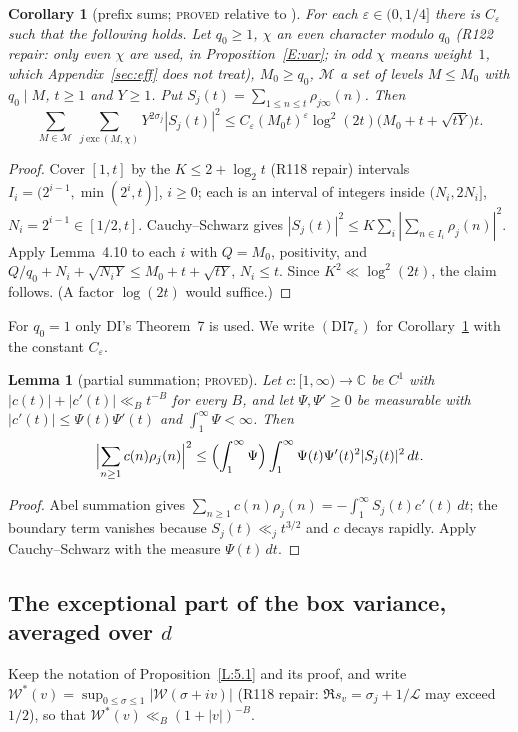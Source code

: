\documentclass[10pt,reqno]{amsart}
\newtheorem{lemma}[theorem]{Lemma}
\newtheorem{corollary}[theorem]{Corollary}
\theoremstyle{definition}
\numberwithin{equation}{section}
\newcommand{\C}{\mathbb C}
\newcommand{\cL}{\mathcal L}
\newcommand{\status}[1]{\textup{\textsc{#1}}}
\begin{document}
\begin{corollary}[prefix sums; \status{proved} relative to \cite{DI,Dr}]\label{E:DI7}
For each $\varepsilon\in(0,1/4]$ there is $C_\varepsilon$ such that the
following holds. Let $q_0\ge1$, $\chi$ an even character modulo $q_0$ (R122 repair: only even $\chi$ are used, in Proposition~\ref{E:var}; in \cite{Dr} odd $\chi$ means weight~$1$, which Appendix~\ref{sec:eff} does not treat), $M_0\ge q_0$,
$\mathcal M$ a set of levels $M\le M_0$ with $q_0\mid M$, $t\ge1$ and
$Y\ge1$. Put $S_j(t)=\sum_{1\le n\le t}\rho_{j\infty}(n)$. Then
\[
 \sum_{M\in\mathcal M}\ \sum_{j\ \mathrm{exc}\ (M,\chi)}
 Y^{2\sigma_j}|S_j(t)|^2
 \le C_\varepsilon(M_0t)^\varepsilon\log^2(2t)
   \bigl(M_0+t+\sqrt{tY}\bigr)t .
\]
\end{corollary}
\begin{proof}
Cover $[1,t]$ by the $K\le2+\log_2t$ (R118 repair) intervals
$I_i=(2^{i-1},\min(2^i,t)]$, $i\ge0$; each is an interval of integers
inside $(N_i,2N_i]$, $N_i=2^{i-1}\in[1/2,t]$. Cauchy--Schwarz gives
$|S_j(t)|^2\le K\sum_i|\sum_{n\in I_i}\rho_j(n)|^2$. Apply
Lemma~4.10 to each $i$ with $Q=M_0$, positivity, and
$Q/q_0+N_i+\sqrt{N_iY}\le M_0+t+\sqrt{tY}$, $N_i\le t$. Since
$K^2\ll\log^2(2t)$, the claim follows. (A factor $\log(2t)$ would suffice.)
\end{proof}
For $q_0=1$ only DI's Theorem~7 is used. We write $(\mathrm{DI7}_\varepsilon)$
for Corollary~\ref{E:DI7} with the constant $C_\varepsilon$.

\begin{lemma}[partial summation; \status{proved}]\label{E:abel}
Let $c:[1,\infty)\to\C$ be $C^1$ with $|c(t)|+|c'(t)|\ll_Bt^{-B}$ for every
$B$, and let $\Psi,\Psi'\ge0$ be measurable with
$|c'(t)|\le\Psi(t)\Psi'(t)$ and $\int_1^\infty\Psi<\infty$. Then
\[
 \Bigl|\sum_{n\ge1}c(n)\rho_j(n)\Bigr|^2\le
 \Bigl(\int_1^\infty\Psi\Bigr)
 \int_1^\infty\Psi(t)\Psi'(t)^2|S_j(t)|^2\,dt .
\]
\end{lemma}
\begin{proof}
Abel summation gives $\sum_{n\ge1}c(n)\rho_j(n)=-\int_1^\infty S_j(t)c'(t)\,dt$;
the boundary term vanishes because $S_j(t)\ll_jt^{3/2}$ and $c$ decays
rapidly. Apply Cauchy--Schwarz with the measure $\Psi(t)\,dt$.
\end{proof}

\subsection*{The exceptional part of the box variance, averaged over \texorpdfstring{$d$}{d}}
Keep the notation of Proposition~\ref{L:5.1} and its proof, and write
$\mathcal W^*(v)=\sup_{0\le\sigma\le1}|\mathcal W(\sigma+iv)|$ (R118 repair: $\Re s_v=\sigma_j+1/\cL$ may exceed $1/2$), so that
$\mathcal W^*(v)\ll_B(1+|v|)^{-B}$.
\end{document}
